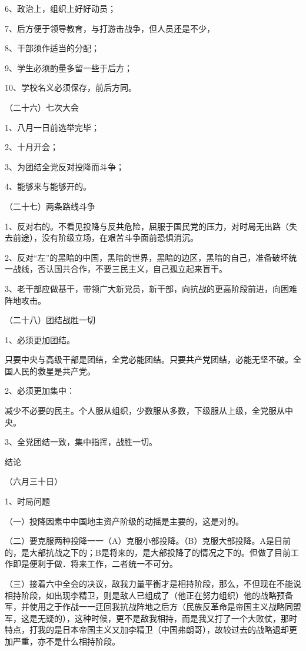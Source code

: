 6、政治上，组织上好好动员；

7、后方便于领导教育，与打游击战争，但人员还是不少，

8、干部须作适当的分配；

9、学生必须酌量多留一些于后方；

10、学校名义必须保存，前后方同。

（二十六）七次大会

1、八月一日前选举完毕；

2、十月开会；

3、为团结全党反对投降而斗争；

4、能够来与能够开的。

（二十七）两条路线斗争

1、反对右的。不看见投降与反共危险，屈服于国民党的压力，对时局无出路（失去前途），没有阶级立场，在艰苦斗争面前恐惧消沉。

2、反对“左”的黑暗的中国，黑暗的世界，黑暗的边区，黑暗的自己，准备破坏统一战线，否认国共合作，不要三民主义，自己孤立起来盲干。

3、老干部应做基干，带领广大新党员，新干部，向抗战的更高阶段前进，向困难阵地攻击。

（二十八）团结战胜一切

1、必须更加团结。

只要中央与高级干部是团结，全党必能团结。只要共产党团结，必能无坚不破。全国人民的救星是共产党。

2、必须更加集中：

减少不必要的民主。个人服从组织，少数服从多数，下级服从上级，全党服从中央。

3、全党团结一致，集中指挥，战胜一切。

结论

（六月三十日）

1、时局问题

（一）投降因素中中国地主资产阶级的动摇是主要的，这是对的。

（二）要克服两种投降一一（A）克服小部投降。（B）克服大部投降。A是目前的，是大部抗战之下的；B是将来的，是大部投降了的情况之下的。但做了目前工作即是便利于做．将来工作，二者统一不可分。

（三）接着六中全会的决议，敌我力量平衡才是相持阶段，那么，不但现在不能说相持阶段，如出现李精卫，则是敌人已组成了（他正在努力组织）他的战略预备军，并使用之于作战一一迂回我抗战阵地之后方（民族反革命是帝国主义战略同盟军，这是无疑的），这种时候，更不是敌我相持，而是我又打了一个大败仗，那时特点，打我的是日本帝国主义又加李精卫（中国弗朗哥），故较过去的战略退却更加严重，亦不是什么相持阶段。

